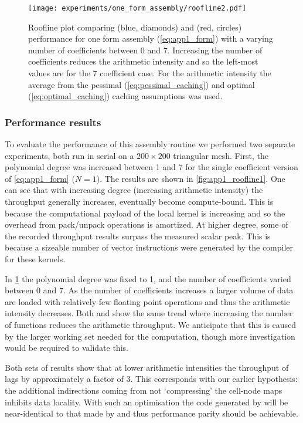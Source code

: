 \documentclass[thesis]{subfiles}
\begin{document}
\begin{figure}
  \centering
  \texttt{[image: experiments/one\_form\_assembly/roofline2.pdf]}
  \caption{
    Roofline plot comparing  (blue, diamonds) and  (red, circles) performance for one form assembly (\cref{eq:app1_form}) with a varying number of coefficients between 0 and 7.
    Increasing the number of coefficients reduces the arithmetic intensity and so the left-most values are for the 7 coefficient case.
    For the arithmetic intensity the average from the pessimal (\cref{eq:pessimal_caching}) and optimal (\cref{eq:optimal_caching}) caching assumptions was used.
  }
  \label{fig:app1_roofline2}
\end{figure}

\subsubsection{Performance results}

To evaluate the performance of this assembly routine we performed two separate experiments, both run in serial on a $200\times 200$ triangular mesh.
First, the polynomial degree was increased between 1 and 7 for the single coefficient version of \cref{eq:app1_form} ($N=1$).
The results are shown in \cref{fig:app1_roofline1}.
One can see that with increasing degree (increasing arithmetic intensity) the throughput generally increases, eventually become compute-bound.
This is because the computational payload of the local kernel is increasing and so the overhead from pack/unpack operations is amortized.
At higher degree, some of the recorded throughput results surpass the measured scalar peak.
This is because a sizeable number of vector instructions were generated by the compiler for these kernels.

In \cref{fig:app1_roofline2} the polynomial degree was fixed to 1, and the number of coefficients varied between 0 and 7.
As the number of coefficients increases a larger volume of data are loaded with relatively few floating point operations and thus the arithmetic intensity decreases.
Both  and  show the same trend where increasing the number of functions reduces the arithmetic throughput.
We anticipate that this is caused by the larger working set needed for the computation, though more investigation would be required to validate this.

Both sets of results show that at lower arithmetic intensities the throughput of  lags  by approximately a factor of 3.
This corresponds with our earlier hypothesis: the additional indirections coming from not `compressing' the cell-node maps inhibits data locality.
With such an optimisation the code generated by  will be near-identical to that made by  and thus performance parity should be achievable.
\end{document}
